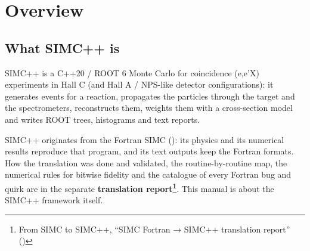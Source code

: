 \chapter{\texorpdfstring{Overview}{Overview}}\label{developer_manual-01u5foverview}
\section{\texorpdfstring{What SIMC++ is}{What SIMC++ is}}\label{developer_manual-01u5foverview:11-what-simc-is}
SIMC++ is a C++20 / ROOT 6 Monte Carlo for coincidence (e,e'X) experiments in Hall C (and Hall A / NPS-like
detector configurations): it generates events for a reaction, propagates the particles through the target and the
spectrometers,\allowbreak{} reconstructs them, weights them with a cross-section model and writes ROOT trees, histograms and text
reports.

SIMC++ originates from the Fortran SIMC (): its physics and its numerical results reproduce that program,
and its text outputs keep the Fortran formats. How the translation was done and validated, the routine-by-routine map,
the numerical rules for bitwise fidelity and the catalogue of every Fortran bug and quirk are in the separate
\textbf{translation report\footnote{From SIMC to SIMC++, ``SIMC Fortran → SIMC++ translation report'' ()}}. This manual is about the SIMC++ framework itself.

